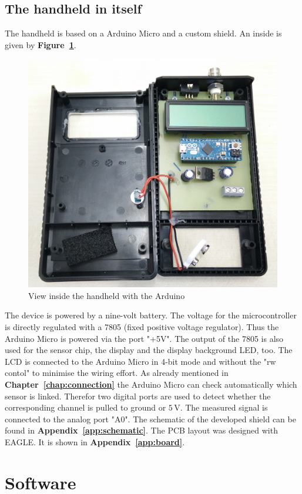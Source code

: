 \documentclass[twoside,accentcolor=tud2a,nochapname,11pt]{tudexercise}
\begin{document}
\subsection{The handheld in itself}
The handheld is based on a Arduino Micro and a custom shield. An inside is given by \textbf{Figure~\ref{pic:inside}}.
\begin{figure}[ht]%
\centering
\includegraphics[width=.75\columnwidth]{../pictures/inside}%
\caption{View inside the handheld with the Arduino}%
\label{pic:inside}%
\end{figure}
The device is powered by a nine-volt battery. The voltage for the microcontroller is directly regulated with a 7805 (fixed positive voltage regulator). Thus the Arduino Micro is powered via the port "+5V". The output of the 7805 is also used for the sensor chip, the display and the display background LED, too.
The LCD is connected to the Arduino Micro in 4-bit mode and without the "rw contol" to minimise the wiring effort.
As already mentioned in \textbf{Chapter~\ref{chap:connection}} the Arduino Micro can check automatically which sensor is linked. Therefor two digital ports are used to detect whether the corresponding channel is pulled to ground or $5\,\mathrm{V}$. The measured signal is connected to the analog port "A0".
The schematic of the developed shield can be found in \textbf{Appendix~\ref{app:schematic}}. The PCB layout was designed with EAGLE. It is shown in \textbf{Appendix~\ref{app:board}}.

\section{Software}
\end{document}

